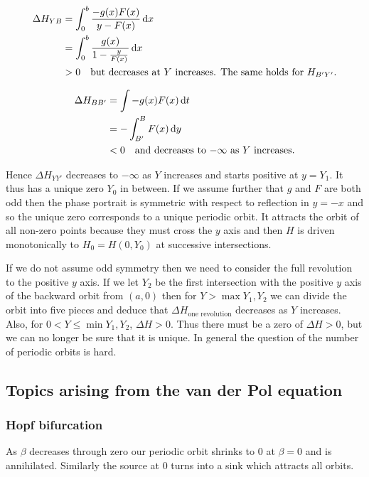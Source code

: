 \documentclass{notes}
\theoremstyle{plain}
\begin{document}
\begin{align*}
\Delta H_{Y B} & = \int_0^b \frac{-g(x) F(x)}{y - F(x)}\,\mathrm{d} x \\
&= \int_0^b \frac{g(x)}{1 - \frac{y}{F(x)}}\,\mathrm{d} x \\
&> 0 \quad \text{but decreases at $Y$ increases.  The same holds for
$H_{B' Y'}$.}
\end{align*}

\begin{align*}
\Delta H_{B B'} &= \int -g(x) F(x)\,\mathrm{d} t \\
&= - \int_{B'}^B F(x)\,\mathrm{d} y \\
& < 0 \quad \text{and decreases to $-\infty$ as $Y$ increases.}
\end{align*}

Hence $\Delta H_{Y Y'}$ decreases to $-\infty$ as $Y$ increases
and starts positive at $y = Y_1$. It thus has a unique zero $Y_0$ in between.
If we assume further that $g$ and $F$ are both odd then the phase portrait is
symmetric with respect to reflection in $y=-x$ and so the unique zero
corresponds to a unique periodic orbit.  It attracts the orbit of all non-zero
points because they must cross the $y$ axis and then $H$ is driven
monotonically to $H_0 = H(0,Y_0)$ at successive intersections.

If we do not assume odd symmetry then we need to consider the full revolution
to the positive $y$ axis. If we let $Y_2$ be the first intersection with
the positive $y$ axis of the backward orbit from $(a,0)$ then
for $Y > \max Y_1, Y_2$ we can divide the orbit into five pieces and
deduce that $\Delta H_{\text{one revolution}}$ decreases as $Y$ increases.
Also, for $0 < Y \le \min Y_1, Y_2$, $\Delta H > 0$.
Thus there must be a zero of $\Delta H > 0$, but we can no longer be sure
that it is unique.  In general the question of the number of periodic orbits
is hard.

\subsection{Topics arising from the van der Pol equation}

\subsubsection*{Hopf bifurcation}

As $\beta$ decreases through zero our periodic orbit shrinks to $0$ at
$\beta=0$ and is annihilated.  Similarly the source at $0$ turns into a sink
which attracts all orbits.
\end{document}
